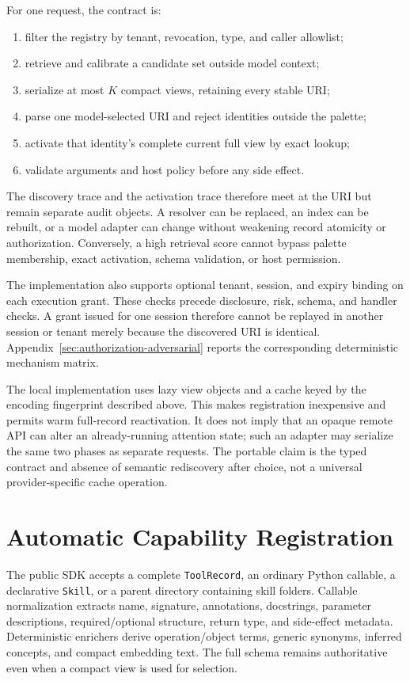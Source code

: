 \documentclass[11pt]{article}
\begin{document}
For one request, the contract is:
\begin{enumerate}[leftmargin=*]
  \item filter the registry by tenant, revocation, type, and caller allowlist;
  \item retrieve and calibrate a candidate set outside model context;
  \item serialize at most $K$ compact views, retaining every stable URI;
  \item parse one model-selected URI and reject identities outside the palette;
  \item activate that identity's complete current full view by exact lookup;
  \item validate arguments and host policy before any side effect.
\end{enumerate}
The discovery trace and the activation trace therefore meet at the URI but
remain separate audit objects. A resolver can be replaced, an index can be
rebuilt, or a model adapter can change without weakening record atomicity or
authorization. Conversely, a high retrieval score cannot bypass palette
membership, exact activation, schema validation, or host permission.

The implementation also supports optional tenant, session, and expiry binding
on each execution grant. These checks precede disclosure, risk, schema, and
handler checks. A grant issued for one session therefore cannot be replayed in
another session or tenant merely because the discovered URI is identical.
Appendix~\ref{sec:authorization-adversarial} reports the corresponding
deterministic mechanism matrix.

The local implementation uses lazy view objects and a cache keyed by the
encoding fingerprint described above. This makes registration inexpensive and
permits warm full-record reactivation. It does not imply that an opaque remote
API can alter an already-running attention state; such an adapter may serialize
the same two phases as separate requests. The portable claim is the typed
contract and absence of semantic rediscovery after choice, not a universal
provider-specific cache operation.

\section{Automatic Capability Registration}

The public SDK accepts a complete \texttt{ToolRecord}, an ordinary Python
callable, a declarative \texttt{Skill}, or a parent directory containing skill
folders. Callable normalization extracts name, signature, annotations,
docstrings, parameter descriptions, required/optional structure, return type,
and side-effect metadata. Deterministic enrichers derive operation/object
terms, generic synonyms, inferred concepts, and compact embedding text. The
full schema remains authoritative even when a compact view is used for
selection.
\end{document}
